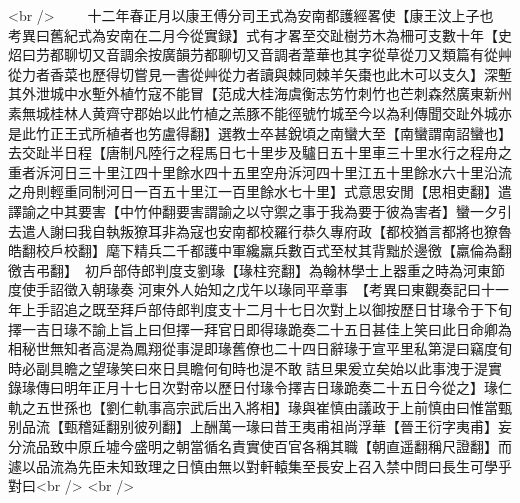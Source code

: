 <br />
　　十二年春正月以康王傅分司王式為安南都護經畧使【康王汶上子也　考異曰舊紀式為安南在二月今從實録】式有才畧至交趾樹芀木為柵可支數十年【史炤曰芀都聊切又音調余按廣韻芀都聊切又音調者葦華也其字從草從刀又類篇有從艸從力者香菜也歷得切嘗見一書從艸從力者讀與棘同棘羊矢棗也此木可以支久】深塹其外泄城中水塹外植竹寇不能冒【范成大桂海虞衡志竻竹刺竹也芒刺森然廣東新州素無城桂林人黄齊守郡始以此竹植之羔豚不能徑號竹城至今以為利傳聞交趾外城亦是此竹正王式所植者也竻盧得翻】選教士卒甚銳頃之南蠻大至【南蠻謂南詔蠻也】去交趾半日程【唐制凡陸行之程馬日七十里步及驢日五十里車三十里水行之程舟之重者泝河日三十里江四十里餘水四十五里空舟泝河四十里江五十里餘水六十里沿流之舟則輕重同制河日一百五十里江一百里餘水七十里】式意思安閒【思相吏翻】遣譯諭之中其要害【中竹仲翻要害謂諭之以守禦之事于我為要于彼為害者】蠻一夕引去遣人謝曰我自執叛獠耳非為寇也安南都校羅行恭久專府政【都校猶言都將也獠魯皓翻校戶校翻】麾下精兵二千都護中軍纔羸兵數百式至杖其背黜於邊徼【羸倫為翻徼吉弔翻】　初戶部侍郎判度支劉瑑【瑑柱兖翻】為翰林學士上器重之時為河東節度使手詔徵入朝瑑奏河東外人始知之戊午以瑑同平章事　【考異曰東觀奏記曰十一年上手詔追之既至拜戶部侍郎判度支十二月十七日次對上以御按歷日甘瑑令于下旬擇一吉日瑑不諭上旨上曰但擇一拜官日即得瑑跪奏二十五日甚佳上笑曰此日命卿為相秘世無知者高湜為鳳翔從事湜即瑑舊僚也二十四日辭瑑于宣平里私第湜曰竊度旬時必副具瞻之望瑑笑曰來日具瞻何旬時也湜不敢詰旦果爰立矣始以此事洩于湜實錄瑑傳曰明年正月十七日次對帝以歷日付瑑令擇吉日瑑跪奏二十五日今從之】瑑仁軌之五世孫也【劉仁軌事高宗武后出入將相】瑑與崔慎由議政于上前慎由曰惟當甄别品流【甄稽延翻别彼列翻】上酬萬一瑑曰昔王夷甫祖尚浮華【晉王衍字夷甫】妄分流品致中原丘墟今盛明之朝當循名責實使百官各稱其職【朝直遥翻稱尺證翻】而遽以品流為先臣未知致理之日慎由無以對軒轅集至長安上召入禁中問曰長生可學乎對曰<br />
<br />
